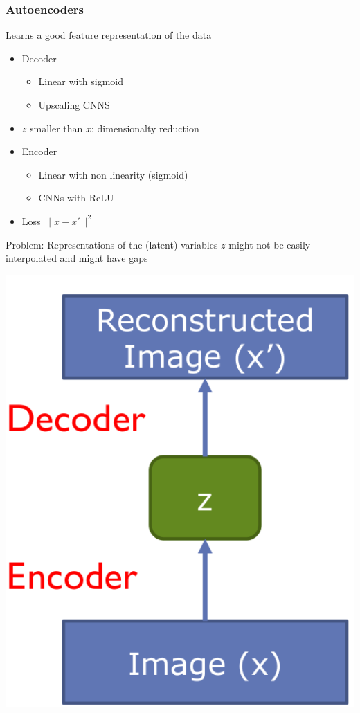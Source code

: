 \begin{minipage}{0.8\textwidth}
    \subsubsection{Autoencoders}
    Learns a good feature representation of the data
    \begin{itemize}
        \item Decoder
              \begin{itemize}
                  \item Linear with sigmoid
                  \item Upscaling CNNS
              \end{itemize}
        \item $z$ smaller than $x$: dimensionalty reduction
        \item Encoder
              \begin{itemize}
                  \item Linear with non linearity (sigmoid)
                  \item CNNs with ReLU
              \end{itemize}
        \item Loss $\lVert x - x'\rVert^2$
    \end{itemize}
    Problem: Representations of the (latent) variables $z$ might not be easily interpolated and might have gaps
\end{minipage}
\begin{minipage}{0.2\textwidth}
    \includegraphics[width=1\textwidth]{sections/GeneratingImages/img/autoencoder.png}
\end{minipage}


